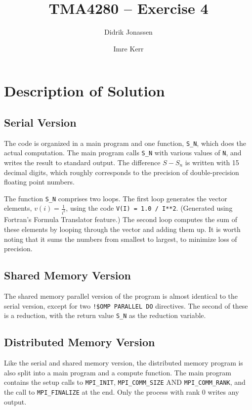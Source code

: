 \documentclass[a4paper, 12pt]{article}
\title{TMA4280 -- Exercise 4}
\author{Didrik Jonassen \and Imre Kerr}
\begin{document}
\maketitle

\section{Description of Solution} %
\label{sec:description_of_solution}
    \subsection{Serial Version} %
        The code is organized in a main program and one function, \texttt{S\_N}, which does the actual computation. The main program calls \texttt{S\_N} with various values of \texttt{N}, and writes the result to standard output. The difference $S-S_n$ is written with 15 decimal digits, which roughly corresponds to the precision of double-precision floating point numbers.

        The function \texttt{S\_N} comprises two loops. The first loop generates the vector elements, $v(i) = \frac{1}{i^2}$, using the code \texttt{V(I) = 1.0 / I**2}. (Generated using Fortran's Formula Translator feature.) The second loop computes the sum of these elements by looping through the vector and adding them up. It is worth noting that it sums the numbers from smallest to largest, to minimize loss of precision.

    \subsection{Shared Memory Version} %
        The shared memory parallel version of the program is almost identical to the serial version, except for two \texttt{!\$OMP PARALLEL DO} directives. The second of these is a reduction, with the return value \texttt{S\_N} as the reduction variable.

    \subsection{Distributed Memory Version} %
        Like the serial and shared memory version, the distributed memory program is also split into a main program and a compute function. The main program contains the setup calls to \texttt{MPI\_INIT}, \texttt{MPI\_COMM\_SIZE} AND \texttt{MPI\_COMM\_RANK}, and the call to \texttt{MPI\_FINALIZE} at the end. Only the process with rank 0 writes any output.
\end{document}
